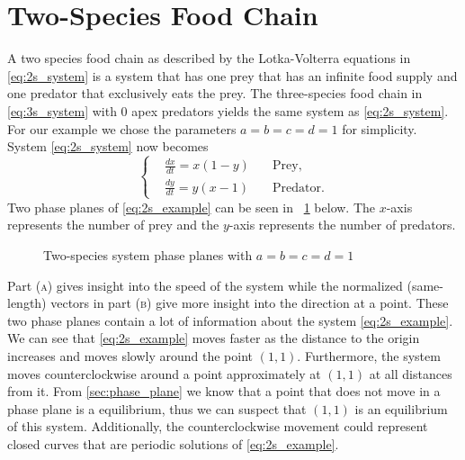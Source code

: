 \documentclass[12pt,a4paper,reqno]{amsart}
\newcommand{\figref}[1]{\textsc{\figurename}~\ref{#1}}
\begin{document}

\newpage
\section{Two-Species Food Chain}

A two species food chain as described by the Lotka-Volterra equations in
\eqref{eq:2s_system} is a system that has one prey that has an infinite food
supply and one predator that exclusively eats the prey. The three-species food
chain in \eqref{eq:3s_system} with 0 apex predators yields the same system as
\eqref{eq:2s_system}. For our example we chose the parameters $a=b=c=d=1$ for
simplicity. System \eqref{eq:2s_system} now becomes
\begin{equation}
    \left\{\begin{aligned}
        &\frac{dx}{dt} = x(1 - y) \quad &\text{Prey,}\\
        &\frac{dy}{dt} = y(x - 1) \quad &\text{Predator.}
    \end{aligned}\right.
    \label{eq:2s_example}
\end{equation}
Two phase planes of \eqref{eq:2s_example} can be seen in
\figref{fig:2s_phase_plane} below. The $x$-axis represents the number of prey
and the $y$-axis represents the number of predators.
\begin{figure}[H]%
\centering
{}%
\quad
{}%
\caption{Two-species system phase planes with $a=b=c=d=1$}%
\label{fig:2s_phase_plane}%
\end{figure}
Part (\textsc{a}) gives insight into the speed of the system while the
normalized (same-length) vectors in part (\textsc{b}) give more insight into
the direction at a point. These two phase planes contain a lot of information
about the system \eqref{eq:2s_example}. We can see that \eqref{eq:2s_example}
moves faster as the distance to the origin increases and moves slowly around
the point $(1,1)$. Furthermore, the system moves counterclockwise around
a point approximately at $(1,1)$ at all distances from it. From
\autoref{sec:phase_plane} we know that a point that does not move in a phase
plane is a equilibrium, thus we can suspect that $(1,1)$ is an equilibrium of
this system. Additionally, the counterclockwise movement could represent closed
curves that are periodic solutions of \eqref{eq:2s_example}. 
\end{document}
